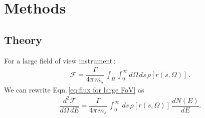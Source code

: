 \documentclass[aps,prl,10pt,twocolumn,superscriptaddress,showpacs]{revtex4-1}
\begin{document}





\section{Methods}
\label{sec:methods}
\subsection{Theory}
\label{sec:theory}

For a large field of view instrument\,\cite{Figueroa-Feliciano:2015gwa}:
\begin{eqnarray}
\mathcal{F} = \dfrac{\Gamma}{4\pi \, m_s} \, \int_{\Omega} \int _0 ^\infty d\Omega \, ds \, \rho[r(s, \Omega)] \, .
\label{eq:flux for large FoV}
\end{eqnarray}
We can rewrite Eqn.\,\ref{eq:flux for large FoV} as 
\begin{eqnarray}
\dfrac{d^2 \mathcal{F}}{d\Omega \, dE} =  \dfrac{\Gamma}{4\pi \, m_s} \, \int _0 ^\infty  \, ds \, \rho[r(s, \Omega)] \, \dfrac{dN(E)}{dE} .
\label{eq:double differential for the flux}
\end{eqnarray}
\end{document}
